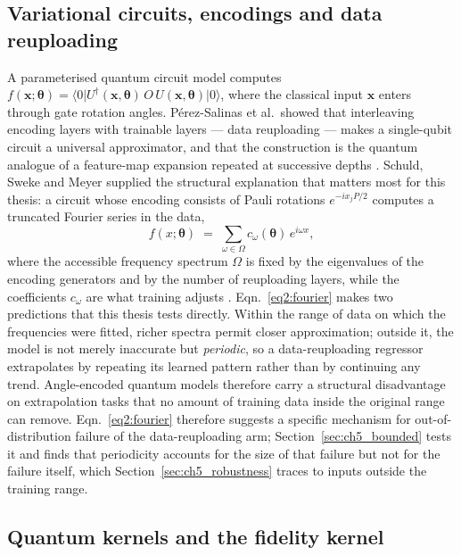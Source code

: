 \documentclass[Thesis.tex]{subfiles}
\begin{document}
\subsection{Variational circuits, encodings and data reuploading}

A parameterised quantum circuit model computes
$f(\mathbf{x};\boldsymbol{\theta}) = \langle 0\rvert
U^{\dagger}(\mathbf{x},\boldsymbol{\theta})\, O \,
U(\mathbf{x},\boldsymbol{\theta}) \lvert 0\rangle$, where the classical input
$\mathbf{x}$ enters through gate rotation angles. P\'erez-Salinas et al.\
showed that interleaving encoding layers with trainable layers --- data
reuploading --- makes a single-qubit circuit a universal approximator, and that
the construction is the quantum analogue of a feature-map expansion repeated
at successive depths \cite{perezsalinas2020reuploading}. Schuld, Sweke and
Meyer supplied the structural explanation that matters most for this thesis: a
circuit whose encoding consists of Pauli rotations $e^{-i x_{j} P/2}$ computes a
truncated Fourier series in the data,
\begin{equation}
  f(x;\boldsymbol{\theta}) \;=\; \sum_{\omega \in \Omega} c_{\omega}(\boldsymbol{\theta})\, e^{i \omega x},
  \label{eq2:fourier}
\end{equation}
where the accessible frequency spectrum $\Omega$ is fixed by the eigenvalues of
the encoding generators and by the number of reuploading layers, while the
coefficients $c_{\omega}$ are what training adjusts
\cite{schuld2021effect}. Eqn.~\eqref{eq2:fourier} makes two predictions
that this thesis tests directly. Within the range of data on which the
frequencies were fitted, richer spectra permit closer approximation; outside
it, the model is not merely inaccurate but \emph{periodic}, so a
data-reuploading regressor extrapolates by repeating its learned pattern rather
than by continuing any trend. Angle-encoded quantum models therefore carry a
structural disadvantage on extrapolation tasks that no amount of training data
inside the original range can remove. Eqn.~\eqref{eq2:fourier} therefore
suggests a specific mechanism for out-of-distribution failure of the
data-reuploading arm; Section~\ref{sec:ch5_bounded} tests it and finds that
periodicity accounts for the size of that failure but not for the failure itself,
which Section~\ref{sec:ch5_robustness} traces to inputs outside the training
range.

\subsection{Quantum kernels and the fidelity kernel}
\end{document}
